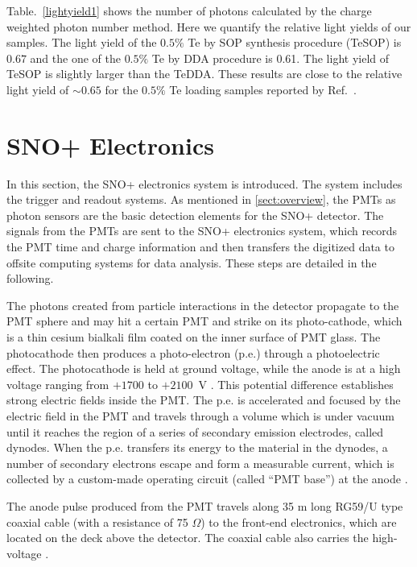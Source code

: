 Table.~\ref{lightyield1} shows the number of photons calculated by the charge weighted photon number method. Here we quantify the relative light yields of our samples. The light yield of the $0.5\%$ Te by SOP synthesis procedure (TeSOP) is $0.67$ and the one of the $0.5\%$ Te by DDA procedure is 0.61. The light yield of TeSOP is slightly larger than the TeDDA. These results are close to the relative light yield of $\sim 0.65$ for the $0.5\%$ Te loading samples reported by Ref.~\cite{biller2017new}.

\section{SNO+ Electronics}

In this section, the SNO+ electronics system is introduced. The system includes the trigger and readout systems. As mentioned in \ref{sect:overview}, the PMTs as photon sensors are the basic detection elements for the SNO+ detector. The signals from the PMTs are sent to the SNO+ electronics system, which records the PMT time and charge information and then transfers the digitized data to offsite computing systems for data analysis. These steps are detailed in the following.

The photons created from particle interactions in the detector propagate to the PMT sphere and may hit a certain PMT and strike on its photo-cathode, which is a thin cesium bialkali film coated on the inner surface of PMT glass. The photocathode then produces a photo-electron (p.e.) through a photoelectric effect. The photocathode is held at ground voltage, while the anode is at a high voltage ranging from $+1700$ to $+2100$~V \cite{boger2000sudbury,dunger2018topological}. This potential difference establishes strong electric fields inside the PMT. The p.e. is accelerated and focused by the electric field in the PMT and travels through a volume which is under vacuum until it reaches the region of a series of secondary emission electrodes, called dynodes. When the p.e. transfers its energy to the material in the dynodes, a number of secondary electrons escape and form a measurable current, which is collected by a custom-made operating circuit (called ``PMT base'') at the anode \cite{hamamatsu2018photomultiplier}.

The anode pulse produced from the PMT travels along 35 m long RG59/U type coaxial cable (with a resistance of 75 $\Omega$) to the front-end electronics, which are located on the deck above the detector. The coaxial cable also carries the high-voltage \cite{boger2000sudbury}. 

